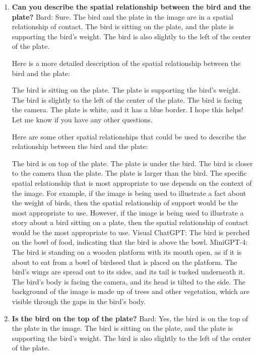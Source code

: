     \begin{enumerate}
        \item \textbf{Can you describe the spatial relationship between the bird and the plate?}
        \subitem Bard:
        Sure. The bird and the plate in the image are in a spatial relationship of contact. The bird is sitting on the plate, and the plate is supporting the bird's weight. The bird is also slightly to the left of the center of the plate.
        
        Here is a more detailed description of the spatial relationship between the bird and the plate:
        
        The bird is sitting on the plate.
        The plate is supporting the bird's weight.
        The bird is slightly to the left of the center of the plate.
        The bird is facing the camera.
        The plate is white, and it has a blue border.
        I hope this helps! Let me know if you have any other questions.
        
        Here are some other spatial relationships that could be used to describe the relationship between the bird and the plate:
        
        The bird is on top of the plate.
        The plate is under the bird.
        The bird is closer to the camera than the plate.
        The plate is larger than the bird.
        The specific spatial relationship that is most appropriate to use depends on the context of the image. For example, if the image is being used to illustrate a fact about the weight of birds, then the spatial relationship of support would be the most appropriate to use. However, if the image is being used to illustrate a story about a bird sitting on a plate, then the spatial relationship of contact would be the most appropriate to use.
        \subitem Visual ChatGPT: The bird is perched on the bowl of food, indicating that the bird is above the bowl.
        \subitem MiniGPT-4: The bird is standing on a wooden platform with its mouth open, as if it is about to eat from a bowl of birdseed that is placed on the platform. The bird’s wings are spread out to its sides, and its tail is tucked underneath it. The bird’s body is facing the camera, and its head is tilted to the side. The background of the image is made up of trees and other vegetation, which are visible through the gaps in the bird’s body.
        \item \textbf{Is the bird on the top of the plate?}
        \subitem Bard: 
        Yes, the bird is on the top of the plate in the image. The bird is sitting on the plate, and the plate is supporting the bird's weight. The bird is also slightly to the left of the center of the plate.
        

\end{enumerate}
